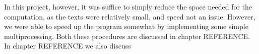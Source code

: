 In this project, however, it was suffice to simply reduce the space
needed for the computation, as the texts were relatively small, and
speed not an issue. However, we were able to speed up the program
somewhat by implementing some simple multiprocessing.  Both these
procedures are discussed in chapter REFERENCE. In chapter REFERENCE we
also discuss  





